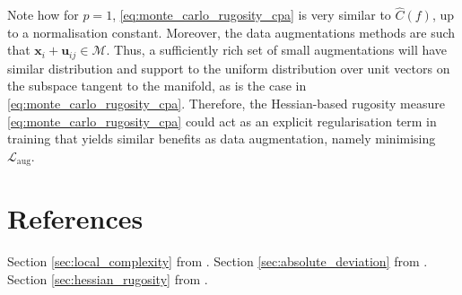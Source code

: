 \begin{remark}
    Note how for $p=1$, \eqref{eq:monte_carlo_rugosity_cpa} is very similar to $\hat{C}(f)$, up to a normalisation constant. Moreover, the data augmentations methods are such that $\mathbf{x}_i+\mathbf{u}_{ij}\in\mathcal{M}$. Thus, a sufficiently rich set of small augmentations will have similar distribution and support to the uniform distribution over unit vectors on the subspace tangent to the manifold, as is the case in \eqref{eq:monte_carlo_rugosity_cpa}. Therefore, the Hessian-based rugosity measure \eqref{eq:monte_carlo_rugosity_cpa} could act as an explicit regularisation term in training that yields similar benefits as data augmentation, namely minimising $\mathcal{L}_{\text{aug}}$.
\end{remark}

\section{References}

Section \ref{sec:local_complexity} from \citet{humayunDeepNetworksAlways2024}. Section \ref{sec:absolute_deviation} from \citet{gambaAreAllLinear2022}. Section \ref{sec:hessian_rugosity} from \citet{lejeuneImplicitRugosityRegularization2019}.